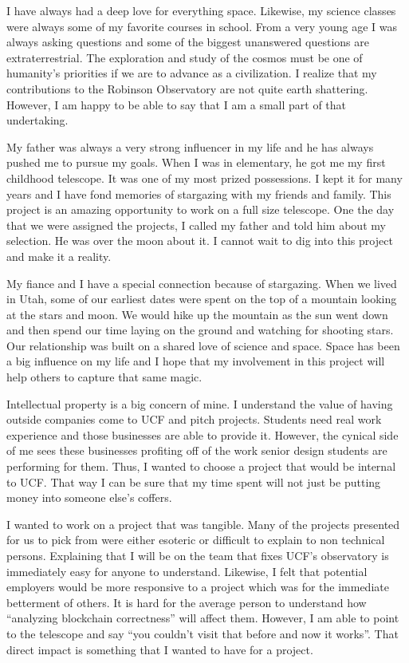 \documentclass[12pt]{report}
\begin{document}
I have always had a deep love for everything space. Likewise, my science classes were always some of my favorite courses in school. From a very young age I was always asking questions and some of the biggest unanswered questions are extraterrestrial. The exploration and study of the cosmos must be one of humanity’s priorities if we are to advance as a civilization. I realize that my contributions to the Robinson Observatory are not quite earth shattering. However, I am happy to be able to say that I am a small part of that undertaking.

My father was always a very strong influencer in my life and he has always pushed me to pursue my goals. When I was in elementary, he got me my first childhood telescope. It was one of my most prized possessions. I kept it for many years and I have fond memories of stargazing with my friends and family. This project is an amazing opportunity to work on a full size telescope. One the day that we were assigned the projects, I called my father and told him about my selection. He was over the moon about it. I cannot wait to dig into this project and make it a reality.

My fiance and I have a special connection because of stargazing. When we lived in Utah, some of our earliest dates were spent on the top of a mountain looking at the stars and moon. We would hike up the mountain as the sun went down and then spend our time laying on the ground and watching for shooting stars. Our relationship was built on a shared love of science and space. Space has been a big influence on my life and I hope that my involvement in this project will help others to capture that same magic.

Intellectual property is a big concern of mine. I understand the value of having outside companies come to UCF and pitch projects. Students need real work experience and those businesses are able to provide it. However, the cynical side of me sees these businesses profiting off of the work senior design students are performing for them. Thus, I wanted to choose a project that would be internal to UCF. That way I can be sure that my time spent will not just be putting money into someone else’s coffers.

I wanted to work on a project that was tangible. Many of the projects presented for us to pick from were either esoteric or difficult to explain to non technical persons. Explaining that I will be on the team that fixes UCF’s observatory is immediately easy for anyone to understand. Likewise, I felt that potential employers would be more responsive to a project which was for the immediate betterment of others. It is hard for the average person to understand how “analyzing blockchain correctness” will affect them. However, I am able to point to the telescope and say “you couldn’t visit that before and now it works”. That direct impact is something that I wanted to have for a project.
\end{document}
